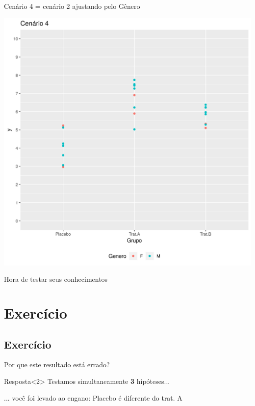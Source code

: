 \documentclass{beamer}
\begin{document}

\begin{frame}[label=cenario4]{\small Cenário 4 = cenário 2 ajustando pelo Gênero}
  \begin{center}
    \includegraphics[height=.9\textheight]{Cap13-30/cenario22}
  \end{center}
\end{frame}

\begin{frame}
  \begin{center}
    Hora de testar seus conhecimentos
  \end{center}
\end{frame}

\section{Exercício}

\subsection{Exercício}



\begin{frame}
  \begin{center}
    Por que este resultado está errado?
  \end{center}

  \vfill
  \begin{block}{Resposta}<2>
    Testamos simultaneamente {\bf 3} hipóteses...

    \bigskip
    \small
    ... você foi levado ao engano: Placebo é diferente do trat. A
  \end{block}
\end{frame}
\end{document}
